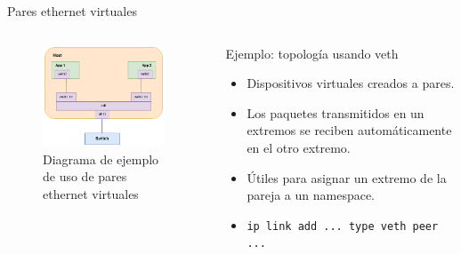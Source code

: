 \documentclass[aspectratio=169,xcolor=dvipsnames]{beamer}
\begin{document}
	\begin{frame}{Pares ethernet virtuales}
	    \begin{columns}
	        \begin{column}{0.5\textwidth}
	                \begin{figure}[h]
                        \includegraphics[width=0.95\textwidth]{img/veth_ej2.png}
                        \caption{Diagrama de ejemplo de uso de pares ethernet virtuales}
                    \end{figure}
	        \end{column}
	        
	        \begin{column}{0.5\textwidth}
	            \begin{block}{Ejemplo: topología usando veth}
	                \begin{itemize}
	                    \item Dispositivos virtuales creados a pares.
	                    \item Los paquetes transmitidos en un extremos se reciben automáticamente en el otro extremo.
	                    \item Útiles para asignar un extremo de la pareja a un namespace.
	                    \item \texttt{ip link add ... type veth peer ...}
	                \end{itemize}
	            \end{block}
	        \end{column}
	    \end{columns}
	\end{frame}
	
\end{document}
